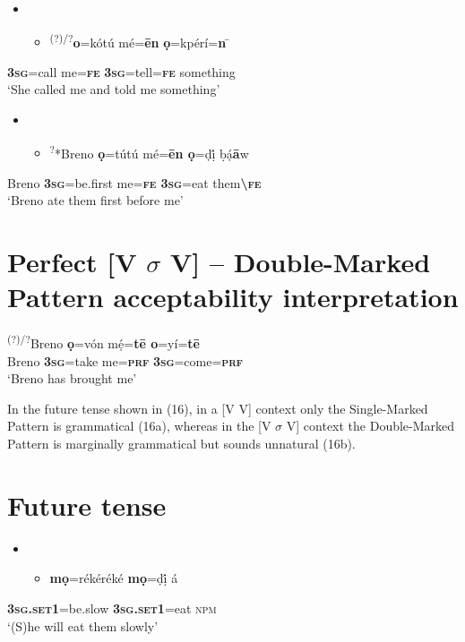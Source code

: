 \documentclass[output=paper]{langsci/langscibook}
\begin{document}
\begin{itemize}
\item \setcounter{itemize}{0}
\begin{itemize}
\item \gll \textsuperscript{   (?)/?}\textbf{o}=kótú    mé=\textbf{\=en}   \textbf{ọ}=kpérí=\textbf{n}   \=\\
\end{itemize}
\end{itemize}
     \textbf{\textsc{    3sg}}=call    me=\textbf{\textsc{fe}}\textsc{   }\textbf{\textsc{3sg}}=tell=\textbf{\textsc{fe}}  something\\
\glt ‘She called me and told me something’
\z

\begin{itemize}
\item \setcounter{itemize}{0}
\begin{itemize}
\item \gll \textsuperscript{     ?}*Breno\textbf{   ọ}=tútú     mé=\textbf{\={e}n  ọ}=ḍị́   ḅạ́\textbf{\={a}}w\\
\end{itemize}
\end{itemize}
         Breno  \textbf{\textsc{3sg}}=be.first  me=\textbf{\textsc{fe   3sg}}=eat  them\textbf{{\textbackslash}}\textbf{\textsc{fe}}\\
\glt ‘Breno ate them first before me’
\z

\chapter[Perfect [V $\sigma $ V{]} – Double{}-Marked Pattern acceptability interpretation]{Perfect [V $\sigma $ V] – Double-Marked Pattern acceptability interpretation}
\label{bkm:Ref448215232}\gll \textsuperscript{ (?)/?}Breno   \textbf{ọ}=vón     mẹ́=\textbf{t\=e     o}=yí=\textbf{t\=e}\\
       Breno   \textbf{\textsc{3sg}}=take   me=\textbf{\textsc{prf}}\textbf{     }\textbf{\textsc{3sg}}=come=\textbf{\textsc{prf}}\\
\glt ‘Breno has brought me’ 
\z

In the future tense shown in (16), in a [V V] context only the Single-Marked Pattern is grammatical (16a), whereas in the [V $\sigma $ V] context the Double-Marked Pattern is marginally grammatical but sounds unnatural (16b). 

\chapter[Future tense]{Future tense}
\label{bkm:Ref453836287}\begin{itemize}
\item \setcounter{itemize}{0}
\begin{itemize}
\item \gll *\textbf{mọ}=rékéréké    \textbf{mọ}=ḍị́       á    \\
\end{itemize}
\end{itemize}
     \textbf{\textsc{3sg.set1}}=be.slow  \textbf{\textsc{3sg}}\textbf{.}\textbf{\textsc{set1}}=eat  \textsc{npm}\\
\glt ‘(S)he will eat them slowly’
\z
\end{document}
